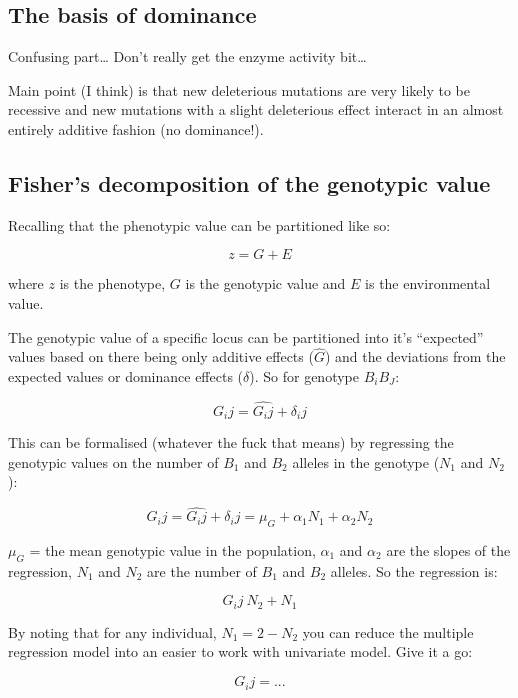 \documentclass[
]{article}
\begin{document}
\hypertarget{the-basis-of-dominance}{%
\subsection{The basis of dominance}\label{the-basis-of-dominance}}

Confusing part\ldots{} Don't really get the enzyme activity bit\ldots{}

Main point (I think) is that new deleterious mutations are very likely
to be recessive and new mutations with a slight deleterious effect
interact in an almost entirely additive fashion (no dominance!).

\hypertarget{fishers-decomposition-of-the-genotypic-value}{%
\subsection{Fisher's decomposition of the genotypic
value}\label{fishers-decomposition-of-the-genotypic-value}}

Recalling that the phenotypic value can be partitioned like so:

\[ z = G + E \]

where \(z\) is the phenotype, \(G\) is the genotypic value and \(E\) is
the environmental value.

The genotypic value of a specific locus can be partitioned into it's
``expected'' values based on there being only additive effects
(\(\hat{G}\)) and the deviations from the expected values or dominance
effects (\(\delta\)). So for genotype \(B_iB_J\):

\[ G_ij = \hat{G_ij} + \delta_ij \]

This can be formalised (whatever the fuck that means) by regressing the
genotypic values on the number of \(B_1\) and \(B_2\) alleles in the
genotype (\(N_1\) and \(N_2\)):

\[ G_ij = \hat{G_ij} + \delta_ij = \mu_G + \alpha_1N_1 + \alpha_2N_2 \]

\(\mu_G\) = the mean genotypic value in the population, \(\alpha_1\) and
\(\alpha_2\) are the slopes of the regression, \(N_1\) and \(N_2\) are
the number of \(B_1\) and \(B_2\) alleles. So the regression is:

\[ G_ij ~ N_2 + N_1 \]

By noting that for any individual, \(N_1 = 2 - N_2\) you can reduce the
multiple regression model into an easier to work with univariate model.
Give it a go:

\[ G_ij = ... \]
\end{document}
